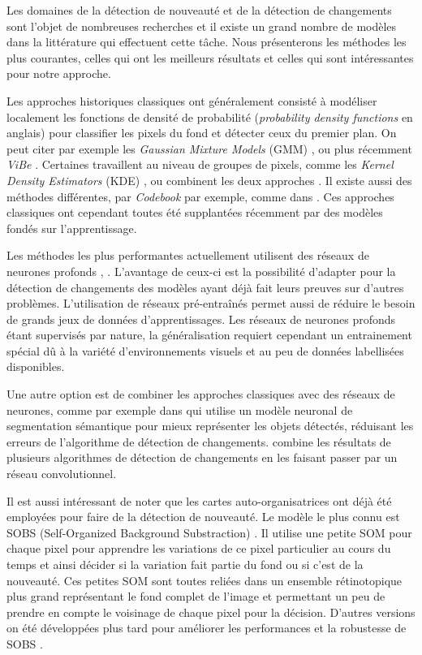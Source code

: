 	Les domaines de la détection de nouveauté et de la détection de changements sont l'objet de nombreuses recherches et il existe un grand nombre de modèles dans la littérature qui effectuent cette tâche. Nous présenterons les méthodes les plus courantes, celles qui ont les meilleurs résultats et celles qui sont intéressantes pour notre approche.

	Les approches historiques classiques ont généralement consisté à modéliser localement les fonctions de densité de probabilité (\textit{probability density functions} en anglais) pour classifier les pixels du fond et détecter ceux du premier plan. On peut citer par exemple les \textit{Gaussian Mixture Models} (GMM) \cite{zivkovic2004improved}, ou plus récemment \textit{ViBe} \cite{barnich2009vibe}. Certaines travaillent au niveau de groupes de pixels, comme les \textit{Kernel Density Estimators} (KDE) \cite{elgammal2000non}, ou combinent les deux approches \cite{toyama1999wallflower}. Il existe aussi des méthodes différentes, par \textit{Codebook} par exemple, comme dans \cite{kim2004background}. Ces approches classiques ont cependant toutes été supplantées récemment par des modèles fondés sur l'apprentissage.

	Les méthodes les plus performantes actuellement utilisent des réseaux de neurones profonds \cite{tezcan2021bsuv}, \cite{bouwmans2019deep}. L'avantage de ceux-ci est la possibilité d'adapter pour la détection de changements des modèles ayant déjà fait leurs preuves sur d'autres problèmes. L'utilisation de réseaux pré-entraînés permet aussi de réduire le besoin de grands jeux de données d'apprentissages. Les réseaux de neurones profonds étant supervisés par nature, la généralisation requiert cependant un entrainement spécial dû à la variété d'environnements visuels et au peu de données labellisées disponibles.

	Une autre option est de combiner les approches classiques avec des réseaux de neurones, comme par exemple dans \cite{braham2017semantic} qui utilise un modèle neuronal de segmentation sémantique pour mieux représenter les objets détectés, réduisant les erreurs de l'algorithme de détection de changements. \cite{zeng2019combining} combine les résultats de plusieurs algorithmes de détection de changements en les faisant passer par un réseau convolutionnel.

	Il est aussi intéressant de noter que les cartes auto-organisatrices ont déjà été employées pour faire de la détection de nouveauté. Le modèle le plus connu est SOBS (Self-Organized Background Substraction) \cite{maddalena2008self}. Il utilise une petite SOM pour chaque pixel pour apprendre les variations de ce pixel particulier au cours du temps et ainsi décider si la variation fait partie du fond ou si c'est de la nouveauté. Ces petites SOM sont toutes reliées dans un ensemble rétinotopique plus grand représentant le fond complet de l'image et permettant un peu de prendre en compte le voisinage de chaque pixel pour la décision. D'autres versions on été développées plus tard pour améliorer les performances et la robustesse de SOBS \cite{gemignani2016robust}.

